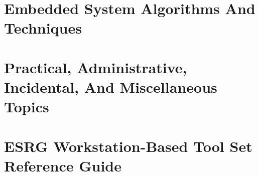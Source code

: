 \documentclass[letterpaper,10pt,titlepage]{custbook}
\begin{document}








\part{Embedded System Algorithms And Techniques}









\part{Practical, Administrative, Incidental, And Miscellaneous Topics}













\part{ESRG Workstation-Based Tool Set Reference Guide}


\end{document}
